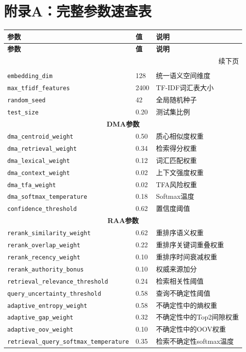 \documentclass[11pt,a4paper]{ctexart}
\begin{document}
\section*{附录A：完整参数速查表}

\begin{longtable}{p{4cm}p{4cm}p{6cm}}
\toprule
\textbf{参数} & \textbf{值} & \textbf{说明} \\
\midrule
\endfirsthead
\midrule
\textbf{参数} & \textbf{值} & \textbf{说明} \\
\midrule
\endhead
\midrule
\multicolumn{3}{r}{\small 续下页} \\
\endfoot
\bottomrule
\endlastfoot

\multicolumn{3}{c}{\textbf{系统级参数}} \\
\midrule
\texttt{embedding\_dim} & 128 & 统一语义空间维度 \\
\texttt{max\_tfidf\_features} & 2400 & TF-IDF词汇表大小 \\
\texttt{random\_seed} & 42 & 全局随机种子 \\
\texttt{test\_size} & 0.20 & 测试集比例 \\
\midrule

\multicolumn{3}{c}{\textbf{DMA参数}} \\
\midrule
\texttt{dma\_centroid\_weight} & 0.50 & 质心相似度权重 \\
\texttt{dma\_retrieval\_weight} & 0.34 & 检索得分权重 \\
\texttt{dma\_lexical\_weight} & 0.12 & 词汇匹配权重 \\
\texttt{dma\_context\_weight} & 0.02 & 上下文强度权重 \\
\texttt{dma\_tfa\_weight} & 0.02 & TFA风险权重 \\
\texttt{dma\_softmax\_temperature} & 0.18 & Softmax温度 \\
\texttt{confidence\_threshold} & 0.62 & 置信度阈值 \\
\midrule

\multicolumn{3}{c}{\textbf{RAA参数}} \\
\midrule
\texttt{rerank\_similarity\_weight} & 0.62 & 重排序语义权重 \\
\texttt{rerank\_overlap\_weight} & 0.22 & 重排序关键词重叠权重 \\
\texttt{rerank\_recency\_weight} & 0.10 & 重排序时间衰减权重 \\
\texttt{rerank\_authority\_bonus} & 0.10 & 权威来源加分 \\
\texttt{retrieval\_relevance\_threshold} & 0.24 & 检索相关性阈值 \\
\texttt{query\_uncertainty\_threshold} & 0.58 & 查询不确定性阈值 \\
\texttt{adaptive\_entropy\_weight} & 0.58 & 不确定性中的熵权重 \\
\texttt{adaptive\_gap\_weight} & 0.32 & 不确定性中的Top2间隙权重 \\
\texttt{adaptive\_oov\_weight} & 0.10 & 不确定性中的OOV权重 \\
\texttt{retrieval\_query\_softmax\_temperature} & 0.35 & 检索不确定性softmax温度 \\
\midrule


\end{longtable}
\end{document}

